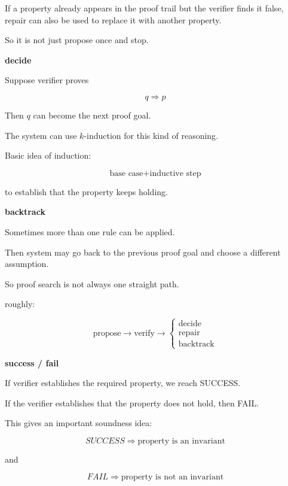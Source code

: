 \documentclass[11pt]{article}
\begin{document}
\vspace{7pt}

If a property already appears in the proof trail
but the verifier finds it false, repair can also
be used to replace it with another property.

So it is not just propose once and stop.

\vspace{7pt}

\textbf{decide}

Suppose verifier proves

\[
q\Rightarrow p
\]

Then $q$ can become the next proof goal.

The system can use $k$-induction for this kind of
reasoning.

Basic idea of induction:

\[
\text{base case}
+
\text{inductive step}
\]

to establish that the property keeps holding.

\vspace{7pt}

\textbf{backtrack}

Sometimes more than one rule can be applied.

Then system may go back to the previous proof goal
and choose a different assumption.

So proof search is not always one straight path.

roughly:

\[
\text{propose}
\rightarrow
\text{verify}
\rightarrow
\begin{cases}
\text{decide}\\
\text{repair}\\
\text{backtrack}
\end{cases}
\]

\vspace{7pt}

\textbf{success / fail}

If verifier establishes the required property,
we reach SUCCESS.

If the verifier establishes that the property does
not hold, then FAIL.

This gives an important soundness idea:

\[
SUCCESS \Rightarrow \text{property is an invariant}
\]

and

\[
FAIL \Rightarrow \text{property is not an invariant}
\]
\end{document}
